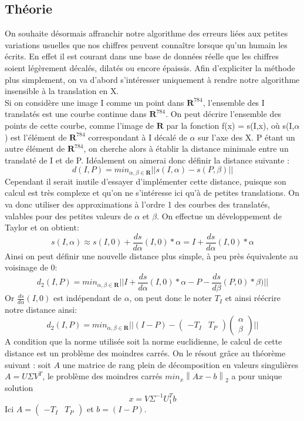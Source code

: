 \documentclass[a4paper,11pt,twoside]{report}
\newcommand{\norm}[1]{\left\lVert#1\right\rVert} %
\begin{document}
\subsection{Théorie}
On souhaite désormais affranchir notre algorithme des erreurs liées aux petites variations usuelles que nos chiffres peuvent connaître lorsque qu'un humain les écrits. En effet il est courant dans une base de données réelle que les chiffres soient légèrement décalés, dilatés ou encore épaissis. Afin d'expliciter la méthode plus simplement, on va d'abord s’intéresser uniquement à rendre notre algorithme insensible à la translation en X. \\
Si on considère une image I comme un point dans $\textbf{R}^{784}$, l'ensemble des I translatés est une courbe continue dans $\textbf{R}^{784}$. On peut décrire l'ensemble des points de cette courbe, comme l'image de $\textbf{R}$ par la fonction f(x) = s(I,x), où s(I,$\alpha$) est l'élément de  $\textbf{R}^{784}$ correspondant à I décalé de $\alpha$ sur l'axe des X. P étant un autre élément de $\textbf{R}^{784}$, on cherche alors à établir la distance minimale entre un translaté de I et de P. Idéalement on aimerai donc définir la distance suivante : $$d(I,P)= min_{\alpha,\beta \in \textbf{R}} ||s(I,\alpha)-s(P,\beta)||$$
Cependant il serait inutile d'essayer d'implémenter cette distance, puisque son calcul est très complexe et qu'on ne s’intéresse ici qu'à de petites translations. On va donc utiliser des approximations à l'ordre 1 des courbes des translatés, valables pour des petites valeurs de $\alpha$ et $\beta$. On effectue un développement de Taylor et on obtient:$$s(I,\alpha)\approx s(I,0) + \frac{ds}{d\alpha}(I,0)*\alpha=I + \frac{ds}{d\alpha}(I,0)*\alpha$$
Ainsi on peut définir une nouvelle distance plus simple, à peu près équivalente au voisinage de 0: $$d_{2}(I,P)= min_{\alpha,\beta \in \textbf{R}} ||I+\frac{ds}{d\alpha}(I,0)*\alpha-P-\frac{ds}{d\beta}(P,0)*\beta)||$$
Or $\frac{ds}{d\alpha}(I,0)$ est indépendant de $\alpha$, on peut donc le noter $T_{I}$ et ainsi réécrire notre distance ainsi: $$d_{2}(I,P)= min_{\alpha,\beta \in \textbf{R}} ||(I-P)-\begin{pmatrix}-T_{I} & T_{P}\end{pmatrix} \begin{pmatrix}\alpha \\ \beta\end{pmatrix} ||$$ 
A condition que la norme utilisée soit la norme euclidienne, le calcul de cette distance est un problème des moindres carrés. On le résout grâce au théorème suivant : soit $A$ une matrice de rang plein de décomposition en valeurs singulières $A = U\Sigma V^T$, le problème des moindres carrés $min_x\norm{Ax-b}_2$ a pour unique solution $$x = V\Sigma^{-1}U_1^Tb$$ Ici $A = \begin{pmatrix}-T_{I} & T_{P}\end{pmatrix}$ et $b = (I-P)$.\\
\end{document}
